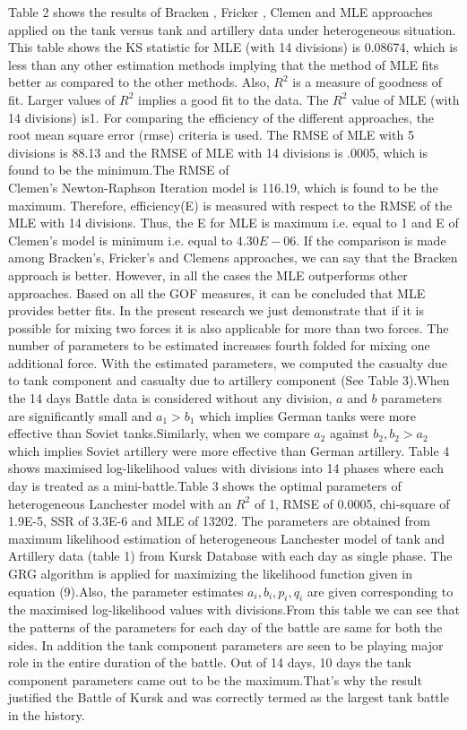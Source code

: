 \documentclass[]{article}
\begin{document}
Table 2 shows the results of Bracken \autocite{Bracken:1995}, Fricker \autocite{Fricker:1998} , Clemen \autocite{Clemens:1997}  and MLE approaches applied on the tank versus tank and artillery data under heterogeneous situation. This table shows the KS statistic for MLE (with 14 divisions) is 0.08674, which is less than any other estimation methods implying that the method of MLE fits better as compared to the other methods. Also, $R^2$ is a measure of goodness of fit. Larger values of $R^2$ implies a good fit to the data. The $R^2$ value of MLE (with 14 divisions) is1. For comparing the efficiency of the different approaches, the root mean square error (\acrshort{rmse}) criteria is used. The RMSE of MLE with 5 divisions is 88.13 and the RMSE of MLE with 14 divisions is .0005, which is found to be the minimum.The RMSE of\\ Clemen’s Newton-Raphson Iteration model is 116.19, which is found to be the maximum. Therefore, efficiency(E) is measured with respect to the RMSE of the MLE with 14 divisions. Thus, the E for MLE is maximum i.e. equal to 1 and E of Clemen’s model is minimum i.e. equal to $4.30E-06$. If the comparison is made among Bracken's, Fricker's and Clemens approaches, we can say that the Bracken approach is better. However, in all the cases the MLE outperforms other approaches. Based on all the GOF measures, it can be concluded that MLE provides better fits.
	In the present research we just demonstrate that if it is possible for mixing two forces it is also applicable for more than two forces. The number of parameters to be estimated increases fourth folded for mixing one additional force. With the estimated parameters, we computed the casualty due to tank component and casualty due to artillery component (See Table 3).When the 14 days Battle data is considered without any division, $a$ and $b$ parameters are significantly small and $a_1>b_1$ which implies German tanks were more effective than Soviet tanks.Similarly, when we compare $a_2$ against $b_2, b_2>a_2$ which implies Soviet artillery were more effective than German artillery. 
Table 4 shows maximised log-likelihood values with divisions into 14 phases where each day is treated as a mini-battle.Table 3 shows the optimal parameters of heterogeneous Lanchester model with an $R^2$ of 1, RMSE of 0.0005, chi-square of 1.9E-5, SSR of 3.3E-6 and MLE of 13202. The parameters are obtained from maximum likelihood estimation of heterogeneous Lanchester model of tank and Artillery data (table 1) from Kursk Database with each day as single phase. The GRG algorithm is applied for maximizing the likelihood function given in equation (9).Also, the parameter estimates $a_i, b_i, p_i, q_i$ are given corresponding to the maximised log-likelihood values with divisions.From this table we can see that the patterns of the parameters for each day of the battle are same for both the sides. In addition the tank component  parameters are seen to be playing major role in the entire duration of the battle. Out of 14 days, 10 days the tank component parameters came out to be the maximum.That’s why the result justified the Battle of Kursk and was correctly termed as the largest tank battle in the history.
\newpage
\end{document}
